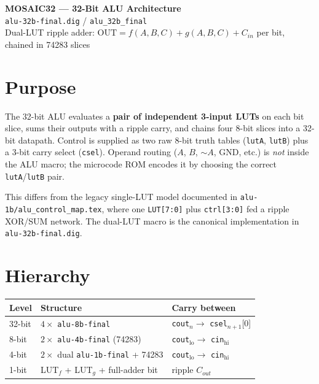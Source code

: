 \documentclass[10pt,a4paper]{article}
\begin{document}
\begin{center}
  {\LARGE \textbf{MOSAIC32 --- 32-Bit ALU Architecture}} \\[0.4em]
  {\large \texttt{alu-32b-final.dig} / \texttt{alu\_32b\_final}} \\[0.3em]
  {\small Dual-LUT ripple adder: $\mathrm{OUT} = f(A,B,C) + g(A,B,C) + C_{in}$ per bit, chained in 74283 slices}
\end{center}

\section{Purpose}

The 32-bit ALU evaluates a \textbf{pair of independent 3-input LUTs} on each bit slice, sums their outputs with a ripple carry, and chains four 8-bit slices into a 32-bit datapath. Control is supplied as two raw 8-bit truth tables (\texttt{lutA}, \texttt{lutB}) plus a 3-bit carry select (\texttt{csel}). Operand routing ($A$, $B$, $\sim A$, GND, etc.) is \emph{not} inside the ALU macro; the microcode ROM encodes it by choosing the correct \texttt{lutA}/\texttt{lutB} pair.

This differs from the legacy single-LUT model documented in \texttt{alu-1b/alu\_control\_map.tex}, where one \texttt{LUT[7:0]} plus \texttt{ctrl[3:0]} fed a ripple XOR/SUM network. The dual-LUT macro is the canonical implementation in \texttt{alu-32b-final.dig}.

\section{Hierarchy}

\begin{center}
\begin{tabular}{@{}lll@{}}
\toprule
\textbf{Level} & \textbf{Structure} & \textbf{Carry between} \\
\midrule
32-bit & $4 \times$ \texttt{alu-8b-final} & \texttt{cout}$_n \rightarrow$ \texttt{csel}$_{n+1}$[0] \\
8-bit  & $2 \times$ \texttt{alu-4b-final} (74283) & \texttt{cout}$_{\mathrm{lo}} \rightarrow$ \texttt{cin}$_{\mathrm{hi}}$ \\
4-bit  & $2 \times$ dual \texttt{alu-1b-final} + 74283 & \texttt{cout}$_{\mathrm{lo}} \rightarrow$ \texttt{cin}$_{\mathrm{hi}}$ \\
1-bit  & LUT$_f$ + LUT$_g$ + full-adder bit & ripple $C_{out}$ \\
\bottomrule
\end{tabular}
\end{center}
\end{document}
